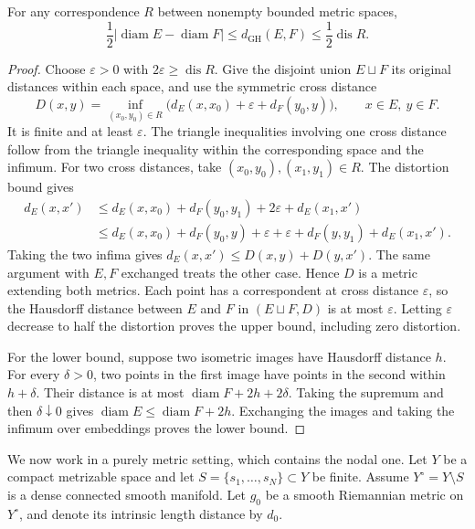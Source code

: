 \begin{lemma}\label{lem:bounded-metric-correspondence}
For any correspondence $R$ between nonempty bounded metric spaces,
\[
 \frac12|\operatorname{diam}E-\operatorname{diam}F|
       \leq d_{\mathrm{GH}}(E,F)
       \leq\frac12\operatorname{dis}R.
\]
\end{lemma}
\begin{proof}
Choose $\varepsilon>0$ with $2\varepsilon\geq\operatorname{dis}R$. Give the disjoint union $E\sqcup F$ its original distances within each space, and use the symmetric cross distance
\[
 D(x,y)=\inf_{(x_0,y_0)\in R}
       \bigl(d_E(x,x_0)+\varepsilon+d_F(y_0,y)\bigr),
       \qquad x\in E,\ y\in F.
\]
It is finite and at least $\varepsilon$. The triangle inequalities involving one cross distance follow from the triangle inequality within the corresponding space and the infimum. For two cross distances, take $(x_0,y_0),(x_1,y_1)\in R$. The distortion bound gives
\[
 \begin{split}
 d_E(x,x')
 &\leq d_E(x,x_0)+d_F(y_0,y_1)
                    +2\varepsilon+d_E(x_1,x')\\
 &\leq d_E(x,x_0)+d_F(y_0,y)+\varepsilon
       +\varepsilon+d_F(y,y_1)+d_E(x_1,x').
 \end{split}
\]
Taking the two infima gives $d_E(x,x')\leq D(x,y)+D(y,x')$. The same argument with $E,F$ exchanged treats the other case. Hence $D$ is a metric extending both metrics. Each point has a correspondent at cross distance $\varepsilon$, so the Hausdorff distance between $E$ and $F$ in $(E\sqcup F,D)$ is at most $\varepsilon$. Letting $\varepsilon$ decrease to half the distortion proves the upper bound, including zero distortion.

For the lower bound, suppose two isometric images have Hausdorff distance $h$. For every $\delta>0$, two points in the first image have points in the second within $h+\delta$. Their distance is at most $\operatorname{diam}F+2h+2\delta$. Taking the supremum and then $\delta\downarrow0$ gives $\operatorname{diam}E\leq\operatorname{diam}F+2h$. Exchanging the images and taking the infimum over embeddings proves the lower bound.
\end{proof}

We now work in a purely metric setting, which contains the nodal one. Let $Y$ be a compact metrizable space and let $S=\{s_1,\ldots,s_N\}\subset Y$ be finite. Assume $Y^\circ=Y\setminus S$ is a dense connected smooth manifold. Let $g_0$ be a smooth Riemannian metric on $Y^\circ$, and denote its intrinsic length distance by $d_0$.

